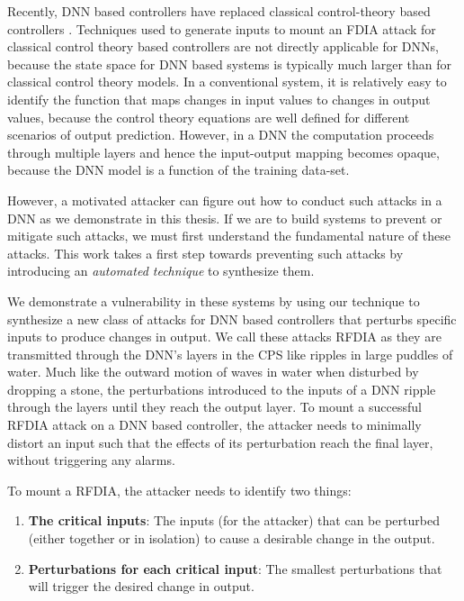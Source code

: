 Recently,  \ac{DNN} based controllers have replaced classical control-theory based controllers \cite{xiang18} \cite{Kocic2019} \cite{bechtel2017deeppicar}.  
Techniques used to generate inputs to mount an FDIA attack for classical control theory based controllers are not directly applicable for DNNs, because the state space for DNN based systems is typically much larger than for classical control theory models. 
In a conventional system, it is relatively easy to identify the function that maps changes in input values to changes in output values, because the control theory equations are well defined for different scenarios of output prediction.
However, in a \ac{DNN} the computation proceeds through multiple layers and hence the input-output mapping becomes opaque, because the \ac{DNN} model is a function of the training data-set.

However, a motivated attacker can figure out how to conduct such attacks in a \ac{DNN} as we demonstrate in this thesis. 
If we are to build systems to prevent or mitigate such attacks, we must first understand the fundamental nature of these attacks. 
This work takes a first step towards preventing such attacks by introducing an {\em automated technique} to synthesize them. 

We demonstrate a vulnerability in these systems by using our technique to synthesize a new class of attacks for DNN based controllers that perturbs specific inputs to produce changes in output. 
We call these attacks \ac{RFDIA} as they are transmitted through the DNN's layers in the CPS like ripples in large puddles of water. 
Much like the outward motion of waves in water when disturbed by dropping a stone, the perturbations introduced to the inputs of a DNN ripple through the layers until they reach the output layer. 
To mount a successful \ac{RFDIA} attack on a DNN based controller, the attacker needs to minimally distort an input such that the effects of its perturbation reach the final layer, without triggering any alarms. 

To mount a \ac{RFDIA}, the attacker needs to identify two things: 
\begin{enumerate}
	\item \textbf{The critical inputs}: The inputs (for the attacker) that can be perturbed (either together or in isolation) to cause a desirable change in the output.
	\item \textbf{Perturbations for each critical input}: The smallest perturbations that will trigger the desired change in output. 
\end{enumerate}


